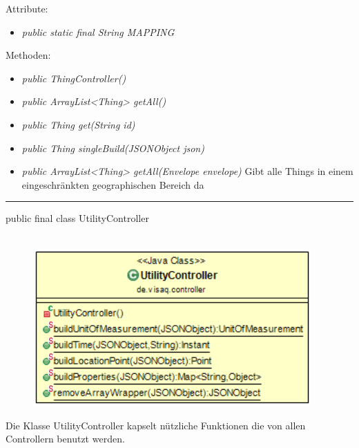 Attribute:
\begin{itemize}
    \item \emph{public static final String MAPPING} \mappingDescription
\end{itemize}
Methoden:
\begin{itemize}
    \item \emph{public ThingController()}
    \item \emph{public ArrayList<Thing> getAll()}
    \extendsSensorthingController
    \item \emph{public Thing get(String id)}
    \extendsSensorthingController
    \item \emph{public Thing singleBuild(JSONObject json)}
    \extendsSensorthingController
    \item \emph{public ArrayList<Thing> getAll(Envelope envelope)}
    Gibt alle Things in einem eingeschränkten geographischen Bereich da
\end{itemize}
\clearpage %
\rule{\textwidth}{0.4pt}
public final class UtilityController
\\\\
\begin{minipage}{0.5\textwidth}
    \begin{figure}[H]
        {\centering\includegraphics[width=0.95\textwidth]{media/backend/controller/classes/UtilityController.png}}
    \end{figure}
    \end{minipage} \hfill
\begin{minipage}{0.5\textwidth}
    Die Klasse UtilityController kapselt nützliche Funktionen die von allen Controllern benutzt werden.
\end{minipage}


